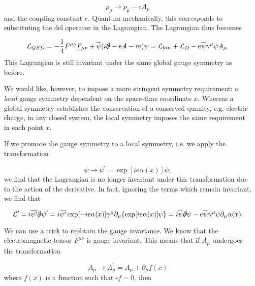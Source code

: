 \documentclass[10pt,a4paper]{book}
\begin{document}
\begin{equation}
p_\mu \rightarrow p_\mu - eA_\mu
\end{equation}
and the coupling constant $e$. Quantum mechanically, this corresponds to substituting the del operator in the Lagrangian. The Lagrangian thus becomes

\begin{equation}
\label{QED lagrangian}
\mathcal{L}_{QED} = -\frac{1}{4}F^{\mu\nu}F_{\mu\nu} + \overline{\psi}(i\slashed{\partial} - e\slashed{A} - m)\psi = \mathcal{L}_{kin} + \mathcal{L}_D - e\overline{\psi}\gamma^\mu \psi A_\mu.
\end{equation}
This Lagrangian is still invariant under the same global gauge symmetry as before. 

We would like, however, to impose a more stringent symmetry requirement: a \emph{local} gauge symmetry dependent on the space-time coordinate $x$. Whereas a global symmetry establishes the conservation of a conserved quanity, e.g. electric charge, in any closed system, the local symmetry imposes the same requirement in each point $x$. 

If we promote the gauge symmetry to a local symmetry, i.e. we apply the transformation 

\begin{equation}
\psi \rightarrow \psi^\prime = \exp[ie\alpha(x)]\psi,
\label{fermi-field transformation}
\end{equation} 
we find that the Lagrangian is no longer invariant under this transformation due to the action of the derivative. In fact, ignoring the terms which remain invariant, we find that

\begin{equation}
\mathcal{L}^\prime = i\overline{\psi^\prime} \slashed{\partial} \psi^\prime = i\overline{\psi^\prime} \exp[-ie\alpha(x)] \gamma^\mu \partial_\mu \lbrace \exp[ie\alpha(x)]\psi \rbrace = i\overline{\psi}\slashed{\partial}\psi - e\overline{\psi}\gamma^\mu\psi\partial_\mu\alpha(x).
\label{local gauge}
\end{equation}

We can use a trick to reobtain the gauge invariance. We know that the electromagnetic tensor $F^{\mu\nu}$ is gauge invariant. This means that if $A_\mu$ undergoes the transformation

\begin{equation}
A_\mu \rightarrow A_{\mu}^\prime = A_\mu + \partial_\mu f(x)
\label{gauge field transformation}
\end{equation}
where $f(x)$ is a function such that $\square f = 0$, then
\end{document}

